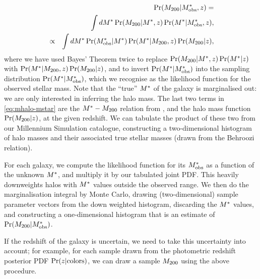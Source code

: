 \documentclass[useAMS,usenatbib,a4paper]{mn2e}
\begin{document}
\begin{eqnarray}
&& \Pr(M_{200}|M^{*}_{\rm obs},z) = \notag\\
&& \int dM^{*} \Pr(M_{200}|M^{*},z) \Pr(M^{*}|M^{*}_{\rm obs},z), \notag\\
&\propto& \int dM^{*} \Pr(M^{*}_{\rm obs}|M^{*}) \Pr(M^{*}|M_{200},z) \Pr(M_{200}|z),
\label{eq:mhalo-mstar}
\end{eqnarray}
where we have used Bayes' Theorem twice to replace
$\Pr(M_{200}|M^{*},z) \Pr(M^{*}|z)$ with 
$\Pr(M^{*}|M_{200},z) \Pr(M_{200}|z)$, and 
to invert $\Pr(M^{*}|M^{*}_{\rm obs})$ into the sampling
distribution $\Pr(M^{*}|M^{*}_{\rm obs})$, which we recognise as the likelihood
function for the observed stellar mass. Note that the ``true'' $M^{*}$ of the
galaxy is marginalised out: we are only interested in inferring the halo
mass. The last two terms in
\eqref{eq:mhalo-mstar} are the $M^{*}-M_{200}$ relation from
\citet{BehrooziEtal2010}, and the halo mass function $\Pr(M_{200}|z)$, at the
given redshift. We can
tabulate the product of these two from our Millennium Simulation catalogue,
constructing a two-dimensional histogram of halo masses and their associated
true stellar masses (drawn from the Behroozi relation). 

For each galaxy, we compute the likelihood function for its $M^{*}_{\rm obs}$ as a
function of the unknown $M^{*}$, and multiply it by our tabulated joint PDF.
This heavily downweights halos with $M^{*}$ values outside the observed
range. We then do the marginalisation integral by Monte Carlo, drawing
(two-dimensional) sample parameter vectors
from the down weighted histogram, discarding the $M^{*}$ values, and
constructing a one-dimensional histogram that is an estimate of
$\Pr(M_{200}|M^{*}_{\rm obs})$.

If the redshift of the galaxy is uncertain, we need to take this
uncertainty into account; for example, for each sample drawn from the
photometric redshift posterior PDF $\Pr(z|{\rm colors})$, we can draw a
sample $M_{200}$ using the above procedure.



% 

% 
% 




\label{lastpage}
\bsp
\end{document}

